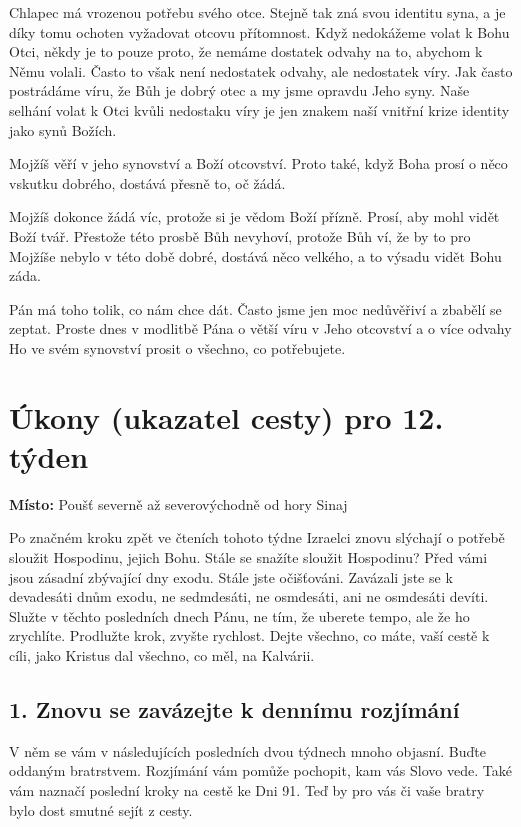 \documentclass[11pt]{article}
\begin{document}
Chlapec má vrozenou potřebu svého otce. Stejně tak zná svou identitu syna, a je díky tomu ochoten vyžadovat otcovu přítomnost.
Když nedokážeme volat k Bohu Otci, někdy je to pouze proto, že nemáme dostatek odvahy na to, abychom k Němu volali. Často
to však není nedostatek odvahy, ale nedostatek víry. Jak často postrádáme víru, že Bůh je dobrý otec a my jsme opravdu Jeho syny.
Naše selhání volat k Otci kvůli nedostaku víry je jen znakem naší vnitřní krize identity jako synů Božích.

Mojžíš věří v jeho synovství a Boží otcovství. Proto také, když Boha prosí o něco vskutku dobrého, dostává přesně to, oč žádá.

Mojžíš dokonce žádá víc, protože si je vědom Boží přízně. Prosí, aby mohl vidět Boží tvář. Přestože této prosbě Bůh nevyhoví,
protože Bůh ví, že by to pro Mojžíše nebylo v této době dobré, dostává něco velkého, a to výsadu vidět Bohu záda.

Pán má toho tolik, co nám chce dát. Často jsme jen moc nedůvěřiví a zbabělí se zeptat. Proste dnes v modlitbě Pána o větší víru
v Jeho otcovství a o více odvahy Ho ve svém synovství prosit o všechno, co potřebujete.


\newpage
\section*{Úkony (ukazatel cesty) pro 12. týden}

\textbf{Místo:} Poušť severně až severovýchodně od hory Sinaj

Po značném kroku zpět ve čteních tohoto týdne Izraelci znovu slýchají o potřebě sloužit Hospodinu, jejich
Bohu. Stále se snažíte sloužit Hospodinu? Před vámi jsou zásadní zbývající dny exodu. Stále jste očišťováni.
Zavázali jste se k devadesáti dnům exodu, ne sedmdesáti, ne osmdesáti, ani ne osmdesáti devíti. Služte
v těchto posledních dnech Pánu, ne tím, že uberete tempo, ale že ho zrychlíte. Prodlužte krok, zvyšte
rychlost. Dejte všechno, co máte, vaší cestě k cíli, jako Kristus dal všechno, co měl, na Kalvárii.

\subsection*{1. Znovu se zavázejte k dennímu rozjímání}
V něm se vám v následujících posledních dvou týdnech mnoho objasní. Buďte oddaným bratrstvem. Rozjímání vám pomůže pochopit, kam vás Slovo vede. Také vám naznačí poslední kroky na cestě ke Dni 91. Teď by pro vás či vaše bratry bylo dost smutné sejít z cesty.
\end{document}
